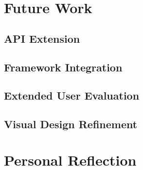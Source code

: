 \section{Future Work}
\subsection{API Extension}
\subsection{Framework Integration}
\subsection{Extended User Evaluation}
\subsection{Visual Design Refinement}

\section{Personal Reflection}

